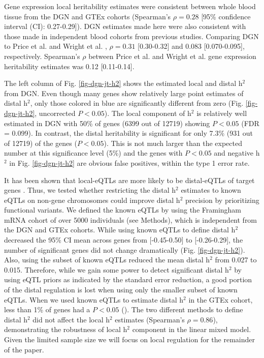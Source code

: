 \documentclass[10pt,letterpaper]{article}
\begin{document}
Gene expression local heritability estimates were consistent between whole blood tissue from the DGN and GTEx cohorts (Spearman's $\rho = 0.28$ [95\% confidence interval (CI): 0.27-0.29]). DGN estimates made here were also consistent with those made in independent blood cohorts from previous studies. Comparing DGN to Price et al. \cite{Price_2011} and Wright et al. \cite{Wright_2014}, $\rho = 0.31$ [0.30-0.32] and 0.083 [0.070-0.095], respectively. Spearman's $\rho$ between Price et al. \cite{Price_2011} and Wright et al. \cite{Wright_2014} gene expression heritability estimates was 0.12 [0.11-0.14].

The left column of Fig. \ref{fig-dgn-jt-h2} shows the estimated local and distal h$^2$ from DGN. Even though many genes show relatively large point estimates of distal h$^2$, only those colored in blue are significantly different from zero (Fig. \ref{fig-dgn-jt-h2}, uncorrected $P < 0.05$). The local component of h$^2$ is relatively well estimated in DGN with 50\% of genes  (6399 out of 12719) showing $P < 0.05$ (FDR = 0.099). %
 In contrast, the distal heritability is significant for only 7.3\% (931 out of 12719) of the genes ($P < 0.05$). This is not much larger than the expected number at this significance level (5\%) and the genes with $P<0.05$ and negative h$^2$ in Fig. \ref{fig-dgn-jt-h2} are obvious false positives, within the type 1 error rate.

It has been shown that local-eQTLs are more likely to be distal-eQTLs of target genes \cite{pierce2014mediation}. Thus, we tested whether restricting the distal h$^2$ estimates to known eQTLs on non-gene chromosomes could improve distal h$^2$ precision by prioritizing functional variants. We defined the known eQTLs by using the Framingham mRNA cohort of over 5000 individuals \cite{Zhang_2015} (see Methods), which is independent from the DGN and GTEx cohorts. While using known eQTLs to define distal h$^2$ decreased the 95\% CI mean across genes from [-0.45-0.50] to [-0.26-0.29], the number of significant genes did not change dramatically (Fig. \ref{fig-dgn-jt-h2}). Also, using the subset of known eQTLs reduced the mean distal h$^2$ from 0.027 to 0.015. Therefore, while we gain some power to detect significant distal h$^2$ by using eQTL priors as indicated by the standard error reduction, a good portion of the distal regulation is lost when using only the smaller subset of known eQTLs. When we used known eQTLs to estimate distal h$^2$ in the GTEx cohort, less than 1\% of genes had a $P < 0.05$ (). The two different methods to define distal h$^2$ did not affect the local h$^2$ estimates (Spearman's $\rho = 0.86$), demonstrating the robustness of local h$^2$ component in the linear mixed model. Given the limited sample size we will focus on local regulation for the remainder of the paper.
\end{document}
